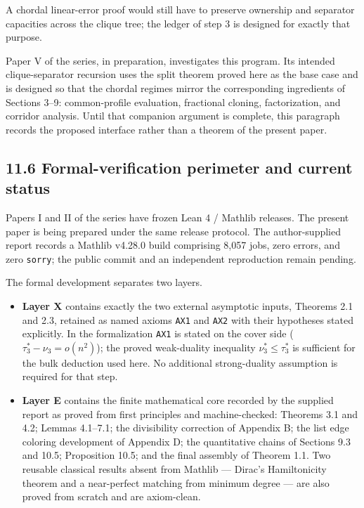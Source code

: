 \documentclass[
  11pt,
]{article}
\providecommand{\tightlist}{%
  \setlength{\itemsep}{0pt}\setlength{\parskip}{0pt}}
\begin{document}
A chordal linear-error proof would still have to preserve ownership and
separator capacities across the clique tree; the ledger of step 3 is
designed for exactly that purpose.

Paper V of the series, in preparation, investigates this program. Its
intended clique-separator recursion uses the split theorem proved here
as the base case and is designed so that the chordal regimes mirror the
corresponding ingredients of Sections 3--9: common-profile evaluation,
fractional cloning, factorization, and corridor analysis. Until that
companion argument is complete, this paragraph records the proposed
interface rather than a theorem of the present paper.

\subsection{11.6 Formal-verification perimeter and current
status}\label{formal-verification-perimeter-and-current-status}

Papers I and II of the series have frozen Lean 4 / Mathlib releases. The
present paper is being prepared under the same release protocol. The
author-supplied report records a Mathlib v4.28.0 build comprising 8,057
jobs, zero errors, and zero \texttt{sorry}; the public commit and an
independent reproduction remain pending.

The formal development separates two layers.

\begin{itemize}
\tightlist
\item
  \textbf{Layer X} contains exactly the two external asymptotic inputs,
  Theorems 2.1 and 2.3, retained as named axioms \texttt{AX1} and
  \texttt{AX2} with their hypotheses stated explicitly. In the
  formalization \texttt{AX1} is stated on the cover side
  (\(\tau_3^*-\nu_3=o(n^2)\)); the proved weak-duality inequality
  \(\nu_3^*\le\tau_3^*\) is sufficient for the bulk deduction used here.
  No additional strong-duality assumption is required for that step.
\item
  \textbf{Layer E} contains the finite mathematical core recorded by the
  supplied report as proved from first principles and machine-checked:
  Theorems 3.1 and 4.2; Lemmas 4.1--7.1; the divisibility correction of
  Appendix B; the list edge coloring development of Appendix D; the
  quantitative chains of Sections 9.3 and 10.5; Proposition 10.5; and
  the final assembly of Theorem 1.1. Two reusable classical results
  absent from Mathlib --- Dirac's Hamiltonicity theorem and a
  near-perfect matching from minimum degree --- are also proved from
  scratch and are axiom-clean.
\end{itemize}
\end{document}
